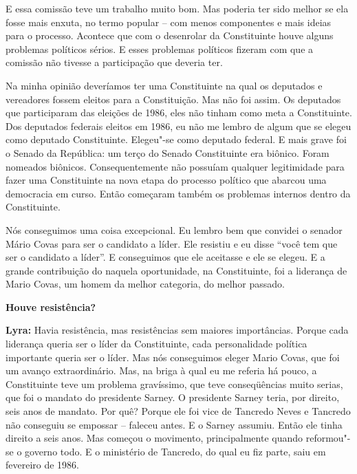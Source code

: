 E essa comissão teve um trabalho muito bom. Mas poderia ter sido melhor
se ela fosse mais enxuta, no termo popular -- com menos componentes e
mais ideias para o processo. Acontece que com o desenrolar da
Constituinte houve alguns problemas políticos sérios. E esses problemas
políticos fizeram com que a comissão não tivesse a participação que
deveria ter.

Na minha opinião deveríamos ter uma Constituinte na qual os deputados e
vereadores fossem eleitos para a Constituição. Mas não foi assim. Os
deputados que participaram das eleições de 1986, eles não tinham como
meta a Constituinte. Dos deputados federais eleitos em 1986, eu não me
lembro de algum que se elegeu como deputado Constituinte. Elegeu"-se como
deputado federal. E mais grave foi o Senado da República: um terço do
Senado Constituinte era biônico. Foram nomeados biônicos.
Consequentemente não possuíam qualquer legitimidade para fazer uma
Constituinte na nova etapa do processo político que abarcou uma
democracia em curso. Então começaram também os problemas internos dentro
da Constituinte.

Nós conseguimos uma coisa excepcional. Eu lembro bem que convidei o
senador Mário Covas para ser o candidato a líder. Ele resistiu e eu
disse ``você tem que ser o candidato a líder''. E conseguimos que ele
aceitasse e ele se elegeu. E a grande contribuição do  naquela
oportunidade, na Constituinte, foi a liderança de Mario Covas, um homem
da melhor categoria, do melhor passado.

\textbf{Houve resistência?}

\textbf{Lyra:} Havia resistência, mas resistências sem maiores
importâncias. Porque cada liderança queria ser o líder da Constituinte,
cada personalidade política importante queria ser o líder. Mas nós
conseguimos eleger Mario Covas, que foi um avanço extraordinário. Mas,
na briga à qual eu me referia há pouco, a Constituinte teve um problema
gravíssimo, que teve conseqüências muito serias, que foi o mandato do
presidente Sarney. O presidente Sarney teria, por direito, seis anos de
mandato. Por quê? Porque ele foi vice de Tancredo Neves e Tancredo não
conseguiu se empossar -- faleceu antes. E o Sarney assumiu. Então ele
tinha direito a seis anos. Mas começou o movimento, principalmente
quando reformou"-se o governo todo. E o ministério de Tancredo, do qual
eu fiz parte, saiu em fevereiro de 1986.

